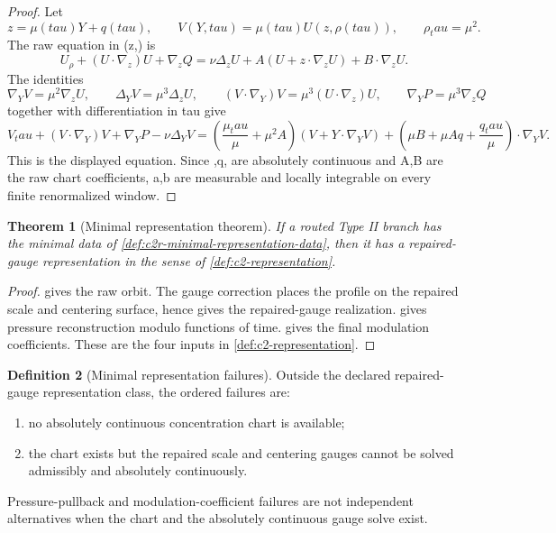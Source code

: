 \documentclass[11pt]{amsart}
\def\({}%
\def\){}%
\def\tau{tau}%
\theoremstyle{plain}
\newtheorem{theorem}{Theorem}[section]
\theoremstyle{definition}
\newtheorem{definition}[theorem]{Definition}
\theoremstyle{remark}
\begin{document}
\begin{proof}
Let
\[
  z=\mu(\tau)Y+q(\tau),\qquad
  V(Y,\tau)=\mu(\tau)U(z,\rho(\tau)),\qquad
  \rho_\tau=\mu^2.
\]
The raw equation in \((z,\rho)\) is
\[
  U_\rho+(U\cdot\nabla_z)U+\nabla_zQ
  =
  \nu\Delta_zU+A(U+z\cdot\nabla_zU)+B\cdot\nabla_zU.
\]
The identities
\[
  \nabla_YV=\mu^2\nabla_zU,\qquad
  \Delta_YV=\mu^3\Delta_zU,\qquad
  (V\cdot\nabla_Y)V=\mu^3(U\cdot\nabla_z)U,\qquad
  \nabla_YP=\mu^3\nabla_zQ
\]
together with differentiation in \(\tau\) give
\[
  V_\tau+(V\cdot\nabla_Y)V+\nabla_YP-\nu\Delta_YV
  =
  \left(\frac{\mu_\tau}{\mu}+\mu^2A\right)(V+Y\cdot\nabla_YV)
  +
  \left(\mu B+\mu Aq+\frac{q_\tau}{\mu}\right)\cdot\nabla_YV.
\]
This is the displayed equation.  Since \(\mu,q,\rho\) are absolutely continuous
and \(A,B\) are the raw chart coefficients, \(a,b\) are measurable and locally
integrable on every finite renormalized window.
\end{proof}

\begin{theorem}[Minimal representation theorem]
\label{thm:c2r-minimal-representation}
If a routed Type II branch has the minimal data of
\cref{def:c2r-minimal-representation-data}, then it has a repaired-gauge
representation in the sense of \cref{def:c2-representation}.
\end{theorem}

\begin{proof}
 gives the raw orbit.  The gauge correction
places the profile on the repaired scale and centering surface, hence gives the
repaired-gauge realization.   gives pressure
reconstruction modulo functions of time.  
gives the final modulation coefficients.  These are the four inputs in
\cref{def:c2-representation}.
\end{proof}

\begin{definition}[Minimal representation failures]
\label{def:c2r-minimal-failures}
Outside the declared repaired-gauge representation class, the ordered failures
are:
\begin{enumerate}[label=\textup{(\roman*)}]
\item no absolutely continuous concentration chart is available;
\item the chart exists but the repaired scale and centering gauges cannot be
solved admissibly and absolutely continuously.
\end{enumerate}
Pressure-pullback and modulation-coefficient failures are not independent
alternatives when the chart and the absolutely continuous gauge solve exist.
\end{definition}
\end{document}
